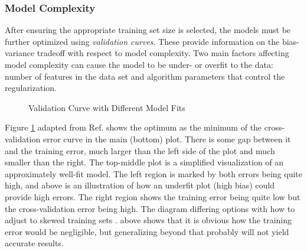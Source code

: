 \subsubsection{Model Complexity}

After ensuring the appropriate training set size is selected, the models must
be further optimized using \textit{validation curves}.  These provide
information on the bias-variance tradeoff with respect to model complexity. Two
main factors affecting model complexity can cause the model to be under- or
overfit to the data: number of features in the data set and algorithm
parameters that control the regularization.

\begin{figure}[!htb]
  \centering
  \caption{Validation Curve with Different Model Fits}
  \label{fig:validation}
\end{figure}

Figure \ref{fig:validation} adapted from Ref. \cite{elements_stats} shows the
optimum as the minimum of the cross-validation error curve in the main (bottom) plot. There is some gap
between it and the training error, much larger than the left side of the plot
and much smaller than the right.  The top-middle plot is a simplified
visualization of an approximately well-fit model.  The left region is marked by
both errors being quite high, and above is an  illustration of how an underfit
plot (high bias) could provide high errors. The right region shows the training
error being quite low but the cross-validation error being high. The diagram
differing options with how to adjust to skewed training sets \cite{scikit}.
above shows that it is obvious how the training error would be negligible, but
generalizing beyond that probably will not yield accurate results. 

